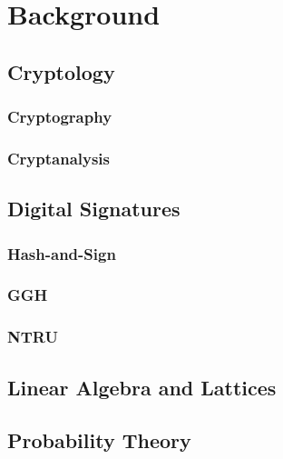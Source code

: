 \chapter{Background}

\section{Cryptology}
\subsection{Cryptography}
\subsection{Cryptanalysis}

\section{Digital Signatures}
\subsection{Hash-and-Sign}
\subsection{GGH}
\subsection{NTRU}

\section{Linear Algebra and Lattices}

\section{Probability Theory}
